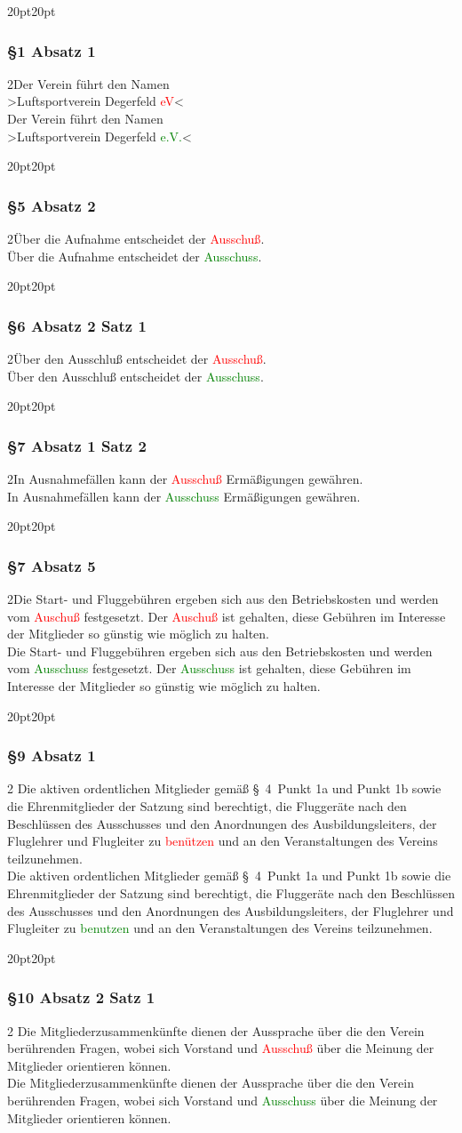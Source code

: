 \documentclass[10pt,a4paper,parskip=half]{scrartcl}
\newcommand{\new}[1]{\textcolor{Green}{#1}}
\newcommand{\old}[1]{\textcolor{Red}{#1}}
\newcommand{\change}[1]{
  \begin{adjustwidth}{20pt}{20pt}
    #1
  \end{adjustwidth}
}
\newcommand{\compare}[3]{\change{\subsubsection*{#1}\begin{multicols}{2}#2\columnbreak\\#3\end{multicols}}}
\begin{document}
  \compare{§1 Absatz 1}
  {Der Verein führt den Namen\\>Luftsportverein Degerfeld \old{eV}<}
  {Der Verein führt den Namen\\>Luftsportverein Degerfeld \new{e.V.}<}

  \compare{§5 Absatz 2}{Über die Aufnahme entscheidet der \old{Ausschuß}.}{Über die Aufnahme entscheidet der \new{Ausschuss}.}

  \compare{§6 Absatz 2 Satz 1}
  {Über den Ausschluß entscheidet der \old{Ausschuß}.}
  {Über den Ausschluß entscheidet der \new{Ausschuss}.}

  \compare{§7 Absatz 1 Satz 2}
  {In Ausnahmefällen kann der \old{Ausschuß} Ermäßigungen gewähren.}
  {In Ausnahmefällen kann der \new{Ausschuss} Ermäßigungen gewähren.}

  \compare{§7 Absatz 5}
  {Die Start- und Fluggebühren ergeben sich aus den Betriebskosten und werden vom \old{Auschuß} festgesetzt.
  Der \old{Auschuß} ist gehalten,
  diese Gebühren im Interesse der Mitglieder so günstig wie möglich zu halten.}
  {Die Start- und Fluggebühren ergeben sich aus den Betriebskosten und werden vom \new{Ausschuss} festgesetzt.
  Der \new{Ausschuss} ist gehalten,
  diese Gebühren im Interesse der Mitglieder so günstig wie möglich zu halten.}

  \compare{§9 Absatz 1}{
    Die aktiven ordentlichen Mitglieder gemäß §~4~Punkt 1a und Punkt 1b
    sowie die Ehrenmitglieder der Satzung sind berechtigt,
    die Fluggeräte nach den Beschlüssen des Ausschusses und den Anordnungen des Ausbildungsleiters,
    der Fluglehrer und Flugleiter zu \old{benützen} und an den Veranstaltungen des Vereins teilzunehmen.
  }{
    Die aktiven ordentlichen Mitglieder gemäß §~4~Punkt 1a und Punkt 1b
    sowie die Ehrenmitglieder der Satzung sind berechtigt,
    die Fluggeräte nach den Beschlüssen des Ausschusses und den Anordnungen des Ausbildungsleiters,
    der Fluglehrer und Flugleiter zu \new{benutzen} und an den Veranstaltungen des Vereins teilzunehmen.
  }

  \compare{§10 Absatz 2 Satz 1}{
    Die Mitgliederzusammenkünfte dienen der Aussprache über die den Verein berührenden Fragen,
    wobei sich Vorstand und \old{Ausschuß} über die Meinung der Mitglieder orientieren können.
  }{
    Die Mitgliederzusammenkünfte dienen der Aussprache über die den Verein berührenden Fragen,
    wobei sich Vorstand und \new{Ausschuss} über die Meinung der Mitglieder orientieren können.
  }
\end{document}
